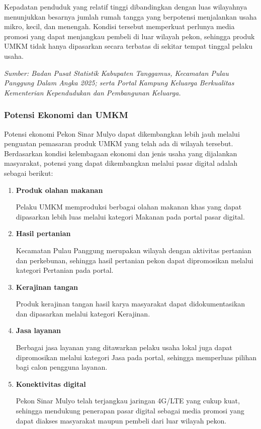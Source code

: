 \documentclass[12pt,a4paper]{article}
\begin{document}
Kepadatan penduduk yang relatif tinggi dibandingkan dengan luas
wilayahnya menunjukkan besarnya jumlah rumah tangga yang berpotensi
menjalankan usaha mikro, kecil, dan menengah. Kondisi tersebut
memperkuat perlunya media promosi yang dapat menjangkau pembeli
di luar wilayah pekon, sehingga produk UMKM tidak hanya dipasarkan
secara terbatas di sekitar tempat tinggal pelaku usaha.

\noindent\textit{Sumber: Badan Pusat Statistik Kabupaten Tanggamus,
Kecamatan Pulau Panggung Dalam Angka 2025; serta Portal Kampung
Keluarga Berkualitas Kementerian Kependudukan dan Pembangunan
Keluarga.}


\subsubsection{Potensi Ekonomi dan UMKM}

Potensi ekonomi Pekon Sinar Mulyo dapat dikembangkan lebih jauh
melalui penguatan pemasaran produk UMKM yang telah ada di wilayah
tersebut. Berdasarkan kondisi kelembagaan ekonomi dan jenis usaha
yang dijalankan masyarakat, potensi yang dapat dikembangkan melalui
pasar digital adalah sebagai berikut:

\begin{enumerate}[
    leftmargin=1.25cm,
    label=\arabic*.,
    itemsep=0pt,
    topsep=0.2cm
]

    \item \textbf{Produk olahan makanan}

    Pelaku UMKM memproduksi berbagai olahan makanan khas yang dapat
    dipasarkan lebih luas melalui kategori Makanan pada portal pasar
    digital.

    \item \textbf{Hasil pertanian}

    Kecamatan Pulau Panggung merupakan wilayah dengan aktivitas
    pertanian dan perkebunan, sehingga hasil pertanian pekon dapat
    dipromosikan melalui kategori Pertanian pada portal.

    \item \textbf{Kerajinan tangan}

    Produk kerajinan tangan hasil karya masyarakat dapat
    didokumentasikan dan dipasarkan melalui kategori Kerajinan.

    \item \textbf{Jasa layanan}

    Berbagai jasa layanan yang ditawarkan pelaku usaha lokal juga
    dapat dipromosikan melalui kategori Jasa pada portal, sehingga
    memperluas pilihan bagi calon pengguna layanan.

    \item \textbf{Konektivitas digital}

    Pekon Sinar Mulyo telah terjangkau jaringan 4G/LTE yang cukup
    kuat, sehingga mendukung penerapan pasar digital sebagai media
    promosi yang dapat diakses masyarakat maupun pembeli dari luar
    wilayah pekon.

\end{enumerate}
\end{document}
